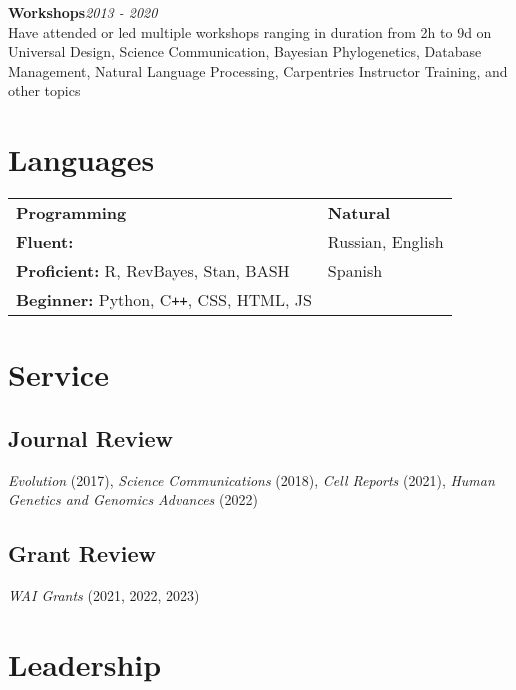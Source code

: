 \documentclass[12pt]{article}
\begin{document}
\textbf{Workshops}\hfill\emph{2013 - 2020}\\
Have attended or led multiple workshops ranging in duration from 2h to 9d on Universal Design, Science Communication, Bayesian Phylogenetics, Database Management, Natural Language Processing, Carpentries Instructor Training, and other topics

\section{Languages}

\noindent\begin{tabular}{@{}ll}
\hspace{2cm} \textbf{Programming}         & \hspace{3cm}                          \textbf{Natural}\\
\textbf{Fluent:} & \hspace{3cm} Russian, English\\
\textbf{Proficient:} R, RevBayes, Stan, BASH &  \hspace{3cm} Spanish\\
\textbf{Beginner:}  \hspace{0.035cm} Python, C\texttt{++}, CSS, HTML, JS &  \hspace{3cm} \\
\end{tabular}


\section{Service}

\subsection{Journal Review}

\emph{Evolution} (2017),  \emph{Science Communications} (2018),  \emph{Cell Reports} (2021), \emph{Human Genetics and Genomics Advances} (2022)

\subsection{Grant Review}

\emph{WAI Grants} (2021,  2022,  2023)

\section{Leadership}
\end{document}
